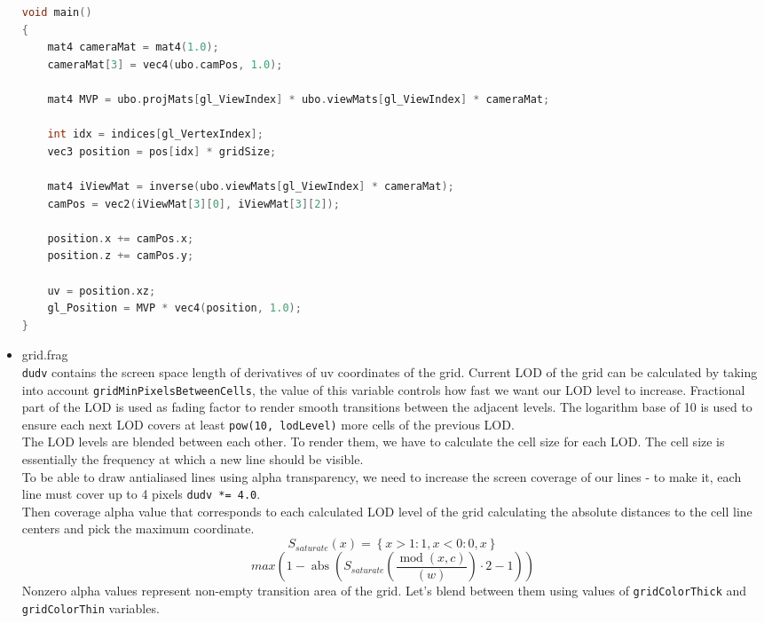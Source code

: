 \begin{itemize}
\begin{lstlisting}[language=c++, caption=Grid vertex shader (./assets/shaders/grid.vert)]
void main()
{
    mat4 cameraMat = mat4(1.0);
    cameraMat[3] = vec4(ubo.camPos, 1.0);

    mat4 MVP = ubo.projMats[gl_ViewIndex] * ubo.viewMats[gl_ViewIndex] * cameraMat;

    int idx = indices[gl_VertexIndex];
    vec3 position = pos[idx] * gridSize;

    mat4 iViewMat = inverse(ubo.viewMats[gl_ViewIndex] * cameraMat);
    camPos = vec2(iViewMat[3][0], iViewMat[3][2]);

    position.x += camPos.x;
    position.z += camPos.y;

    uv = position.xz;
    gl_Position = MVP * vec4(position, 1.0);
}
\end{lstlisting}
    \item grid.frag\\
    \texttt{dudv} contains the screen space length of derivatives of uv coordinates of the grid. Current LOD of the grid can be calculated by taking into account \texttt{gridMinPixelsBetweenCells}, the value of this variable controls how fast we want our LOD level to increase. Fractional part of the LOD is used as fading factor to render smooth transitions between the adjacent levels. The logarithm base of 10 is used to ensure each next LOD covers at least \texttt{pow(10, lodLevel)} more cells of the previous LOD.\\
    The LOD levels are blended between each other. To render them, we have to calculate the cell size for each LOD. The cell size is essentially the frequency at which a new line should be visible.\\
    To be able to draw antialiased lines using alpha transparency, we need to increase the screen coverage of our lines - to make it, each line must cover up to 4 pixels \texttt{dudv *= 4.0}.\\
    Then coverage alpha value that corresponds to each calculated LOD level of the grid calculating the absolute distances to the cell line centers and pick the maximum coordinate.\\
\begin{equation}
S_{saturate}\left(x\right)=\left\{x>1:1,x<0:0,x\right\}
\end{equation}
\begin{equation}
max\left(1-\operatorname{abs}\left(S_{saturate}\left(\frac{\operatorname{mod}\left(x,c\right)}{\left(w\right)}\right)\cdot2-1\right)\right)
\end{equation}
    Nonzero alpha values represent non-empty transition area of the grid. Let's blend between them using values of \texttt{gridColorThick} and \texttt{gridColorThin} variables.\\

\end{itemize}
